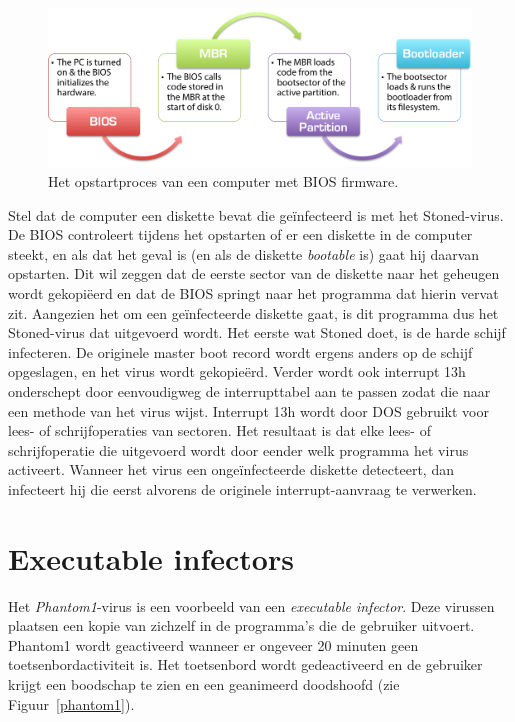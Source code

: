 \begin{figure}
\begin{center}
\includegraphics[width=125mm]{images/MBR-Boot-Sequence.png}
\end{center}
\caption{Het opstartproces van een computer met BIOS firmware.}
\label{boot-sequence}
\end{figure}

Stel dat de computer een diskette bevat die ge\"infecteerd is met het Stoned-virus. De BIOS controleert tijdens het opstarten of er een diskette in de computer steekt, en als dat het geval is (en als de diskette \emph{bootable} is) gaat hij daarvan opstarten. Dit wil zeggen dat de eerste sector van de diskette naar het geheugen wordt gekopi\"eerd en dat de BIOS springt naar het programma dat hierin vervat zit. Aangezien het om een ge\"infecteerde diskette gaat, is dit programma dus het Stoned-virus dat uitgevoerd wordt. Het eerste wat Stoned doet, is de harde schijf infecteren. De originele master boot record wordt ergens anders op de schijf opgeslagen, en het virus wordt gekopie\"erd. Verder wordt ook interrupt 13h onderschept door eenvoudigweg de interrupttabel aan te passen zodat die naar een methode van het virus wijst. Interrupt 13h wordt door DOS gebruikt voor lees- of schrijfoperaties van sectoren. Het resultaat is dat elke lees- of schrijfoperatie die uitgevoerd wordt door eender welk programma het virus activeert. Wanneer het virus een onge\"infecteerde diskette detecteert, dan infecteert hij die eerst alvorens de originele interrupt-aanvraag te verwerken.

\section{Executable infectors}

Het \emph{Phantom1}-virus is een voorbeeld van een \emph{executable infector}. Deze virussen plaatsen een kopie van zichzelf in de programma's die de gebruiker uitvoert. Phantom1 wordt geactiveerd wanneer er ongeveer 20 minuten geen toetsenbordactiviteit is. Het toetsenbord wordt gedeactiveerd en de gebruiker krijgt een boodschap te zien en een geanimeerd doodshoofd (zie Figuur~\ref{phantom1}).

